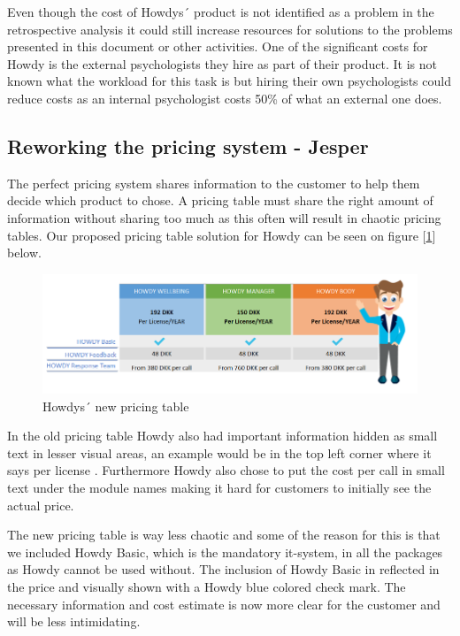\noindent Even though the cost of Howdys´ product is not identified as a problem in the retrospective analysis it could still increase resources for solutions to the problems presented in this document or other activities. One of the significant costs for Howdy is the external psychologists they hire as part of their product. It is not known what the workload for this task is but hiring their own psychologists could reduce costs as an internal psychologist costs 50\% of what an external one does.

\subsection{Reworking the pricing system - Jesper}
The perfect pricing system shares information to the customer to help them decide which product to chose. A pricing table must share the right amount of information without sharing too much as this often will result in chaotic pricing tables. Our proposed pricing table solution for Howdy can be seen on figure [\ref{pricingtable}] below.

\begin{figure}[H]
\centering
\includegraphics[scale=0.72]{figures/pricing_Howdy.png}
\caption{Howdys´ new pricing table}
\label{pricingtable}
\end{figure}

\noindent In the old pricing table Howdy also had important information hidden as small text in lesser visual areas, an example would be in the top left corner where it says per license \cite[p.30]{oneofthepresentations}. Furthermore Howdy also chose to put the cost per call in small text under the module names making it hard for customers to initially see the actual price. 

\noindent The new pricing table is way less chaotic and some of the reason for this is that we included Howdy Basic, which is the mandatory it-system, in all the packages as Howdy cannot be used without. The inclusion of Howdy Basic in reflected in the price and visually shown with a Howdy blue colored check mark. The necessary information and cost estimate is now more clear for the customer and will be less intimidating.


